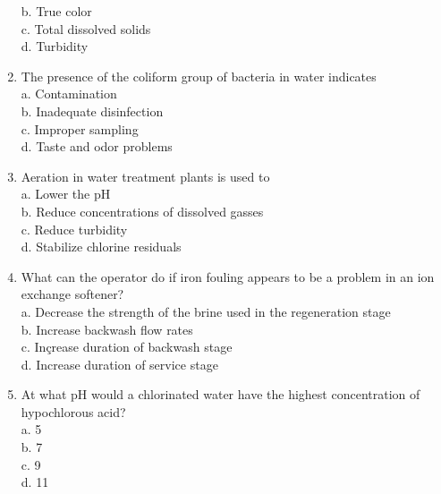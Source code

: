 \begin{enumerate}
b. True color\\

c. Total dissolved solids\\

d. Turbidity\\


\item The presence of the coliform group of bacteria in water indicates\\

a. Contamination\\

b. Inadequate disinfection\\

c. Improper sampling\\

d. Taste and odor problems\\

\item Aeration in water treatment plants is used to\\

a. Lower the $\mathrm{pH}$\\

b. Reduce concentrations of dissolved gasses\\

c. Reduce turbidity\\

d. Stabilize chlorine residuals


\item What can the operator do if iron fouling appears to be a problem in an ion exchange softener?\\

a. Decrease the strength of the brine used in the regeneration stage\\

b. Increase backwash flow rates\\

c. Inçrease duration of backwash stage\\

d. Increase duration of service stage\\


  \item At what $\mathrm{pH}$ would a chlorinated water have the highest concentration of hypochlorous acid?\\
a. 5\\
b. 7\\
c. 9\\
d. 11\\


\end{enumerate}
